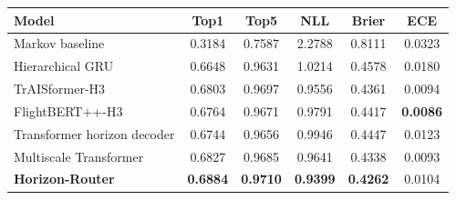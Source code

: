 \begin{tabular}{lccccc}
\toprule
Model & Top1 & Top5 & NLL & Brier & ECE \\
\midrule
Markov baseline & 0.3184 & 0.7587 & 2.2788 & 0.8111 & 0.0323 \\
Hierarchical GRU & 0.6648 & 0.9631 & 1.0214 & 0.4578 & 0.0180 \\
TrAISformer-H3 & 0.6803 & 0.9697 & 0.9556 & 0.4361 & 0.0094 \\
FlightBERT++-H3 & 0.6764 & 0.9671 & 0.9791 & 0.4417 & \textbf{0.0086} \\
Transformer horizon decoder & 0.6744 & 0.9656 & 0.9946 & 0.4447 & 0.0123 \\
Multiscale Transformer & 0.6827 & 0.9685 & 0.9641 & 0.4338 & 0.0093 \\
\textbf{Horizon-Router} & \textbf{0.6884} & \textbf{0.9710} & \textbf{0.9399} & \textbf{0.4262} & 0.0104 \\
\bottomrule
\end{tabular}

